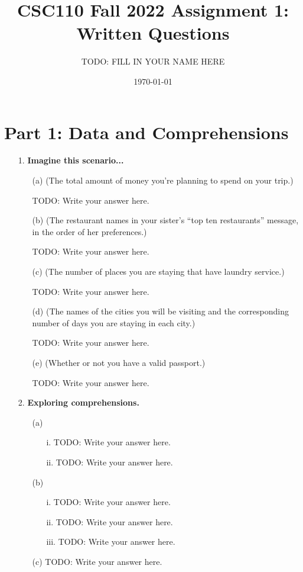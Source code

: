 \documentclass[12pt]{article}
\title{CSC110 Fall 2022 Assignment 1: Written Questions}
\author{TODO: FILL IN YOUR NAME HERE}
\date{\today}
\begin{document}
\maketitle

\section*{Part 1: Data and Comprehensions}

\begin{enumerate}
\item[1.] \textbf{Imagine this scenario...}
\begin{enumerate}
\item[(a)] (The total amount of money you're planning to spend on your trip.)

TODO: Write your answer here.

\item[(b)] (The restaurant names in your sister's ``top ten restaurants'' message, in the order of her preferences.)

TODO: Write your answer here.

\item[(c)] (The number of places you are staying that have laundry service.)

TODO: Write your answer here.

\item[(d)] (The names of the cities you will be visiting and the corresponding number of days you are staying in each city.)

TODO: Write your answer here.

\item[(e)] (Whether or not you have a valid passport.)

TODO: Write your answer here.
\end{enumerate}

\item[2.] \textbf{Exploring comprehensions.}

\begin{enumerate}
\item[(a)]
\begin{enumerate}
    \item[i.] TODO: Write your answer here.
    \item[ii.] TODO: Write your answer here.
\end{enumerate}
\item[(b)]
\begin{enumerate}
    \item[i.] TODO: Write your answer here.
    \item[ii.] TODO: Write your answer here.
    \item[iii.] TODO: Write your answer here.
\end{enumerate}
\item[(c)]
TODO: Write your answer here.
\end{enumerate}
\end{enumerate}
\end{document}
